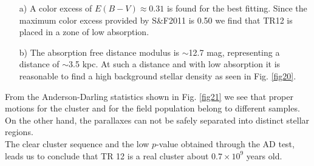 \documentclass[draft]{aa}
\begin{document}
\begin{itemize}
\item [a)] A color excess of $E(B-V)\approx0.31$ is found for the best fitting.
    Since the maximum color excess provided by S\&F2011 is 0.50 we find that
    TR12 is placed in a zone of low absorption.
\item [b)] The absorption free distance modulus is $\sim$12.7 mag, representing
    a distance of $\sim$3.5 kpc. At such a distance and with low absorption it
    is reasonable to find a high background stellar density as seen in Fig. 
    \ref{fig20}.
\end{itemize}

From the Anderson-Darling statistics shown in Fig. \ref{fig21} we see that
proper motions for the cluster and for the field population belong to different
samples. On the other hand, the parallaxes can not be safely separated into
distinct stellar regions.\\

The clear cluster sequence and the low $p$-value obtained through the AD test,
leads us to conclude that TR 12 is a real cluster about $0.7\times10^9$ years
old.
\end{document}

